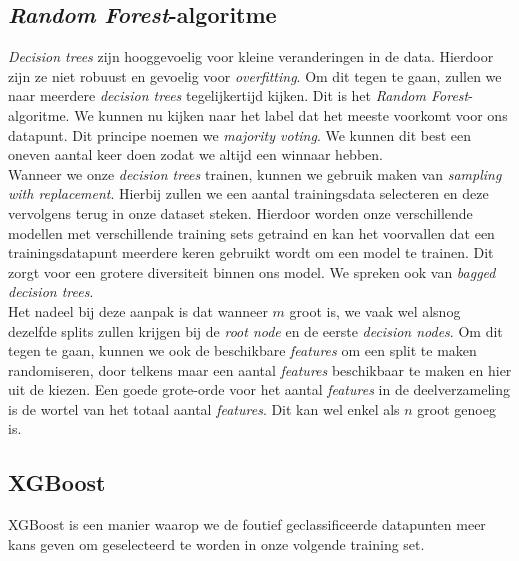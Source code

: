 \subsection{\textit{Random Forest}-algoritme}

\textit{Decision trees} zijn hooggevoelig voor kleine veranderingen in de data. Hierdoor zijn ze niet robuust en gevoelig voor \textit{overfitting}. Om dit tegen te gaan, zullen we naar meerdere \textit{decision trees} tegelijkertijd kijken. Dit is het \textit{Random Forest}-algoritme. We kunnen nu kijken naar het label dat het meeste voorkomt voor ons datapunt. Dit principe noemen we \textit{majority voting}. We kunnen dit best een oneven aantal keer doen zodat we altijd een winnaar hebben. \\
\newline
Wanneer we onze \textit{decision trees} trainen, kunnen we gebruik maken van \textit{sampling with replacement}. Hierbij zullen we een aantal trainingsdata selecteren en deze vervolgens terug in onze dataset steken. Hierdoor worden onze verschillende modellen met verschillende training sets getraind en kan het voorvallen dat een trainingsdatapunt meerdere keren gebruikt wordt om een model te trainen. Dit zorgt voor een grotere diversiteit binnen ons model. We spreken ook van \textit{bagged decision trees}. \\
\newline
Het nadeel bij deze aanpak is dat wanneer $m$ groot is, we vaak wel alsnog dezelfde splits zullen krijgen bij de \textit{root node} en de eerste \textit{decision nodes}. Om dit tegen te gaan, kunnen we ook de beschikbare \textit{features} om een split te maken randomiseren, door telkens maar een aantal \textit{features} beschikbaar te maken en hier uit de kiezen. Een goede grote-orde voor het aantal \textit{features} in de deelverzameling is de wortel van het totaal aantal \textit{features}. Dit kan wel enkel als $n$ groot genoeg is.

\subsection{XGBoost}

XGBoost is een manier waarop we de foutief geclassificeerde datapunten meer kans geven om geselecteerd te worden in onze volgende training set. 